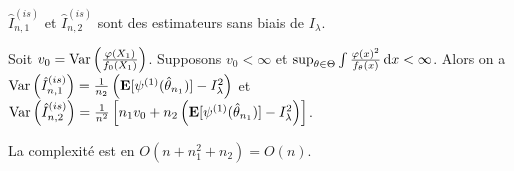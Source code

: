 	\begin{pop}
		$\hat{I}_{n,1}^{(is)}$ et $\hat{I}_{n,2}^{(is)}$ sont des estimateurs sans biais de $I_\lambda$.
	\end{pop}
	
	\begin{pop}
		Soit $v_0 = \operatorname{Var} \left( \frac{\varphi(X_1)}{f_0(X_1)} \right)$.
		Supposons $v_0 < \infty$ et $\sup_{\theta \in \Theta} \int \frac{\varphi(x)^2}{f_\theta(x)} \mathop{}\mathopen{}\mathrm{d} x < \infty$.
		Alors on a $\operatorname{Var} \left( \hat{I}_{n,1}^{(is)} \right) = \frac{1}{n_2} \left( \mathbf{E}[\psi^{(1)}(\hat{\theta}_{n_1})] - I_\lambda^2 \right)$ et $\operatorname{Var} \left( \hat{I}_{n,2}^{(is)} \right) = \frac{1}{n^2} \left[ n_1 v_0 + n_2 \left( \mathbf{E}[\psi^{(1)}(\hat{\theta}_{n_1})] - I_\lambda^2 \right) \right]$.
	\end{pop}
	
	La complexité est en $O(n + n_1^2 + n_2) = O(n)$.